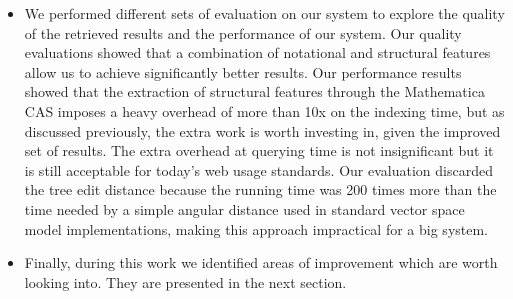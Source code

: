 \begin{itemize}
\item We performed different sets of evaluation on our system to explore the quality of the retrieved results and the performance of our system. Our quality evaluations showed that a combination of notational and structural features allow us to achieve significantly better results. Our performance results showed that the extraction of structural features through the Mathematica CAS imposes a heavy overhead of more than 10x on the indexing time, but as discussed previously, the extra work is worth investing in, given the improved set of results. The extra overhead at querying time is not insignificant but it is still acceptable for today's web usage standards. Our evaluation discarded the tree edit distance because the running time was 200 times more than the time needed by a simple angular distance used in standard vector space model implementations, making this approach impractical for a big system.
\item Finally, during this work we identified areas of improvement which are worth looking into. They are presented in the next section.
\end{itemize}

